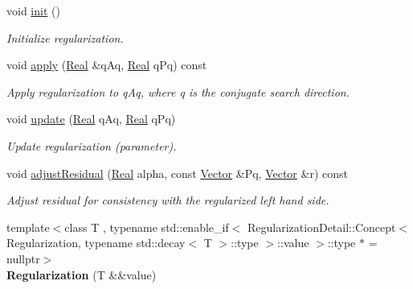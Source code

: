 \begin{DoxyCompactItemize}
\item 
\hypertarget{classSpacy_1_1CG_1_1Regularization_a0a92edab4bf50bd27bc549311c736cd5}{void \hyperlink{classSpacy_1_1CG_1_1Regularization_a0a92edab4bf50bd27bc549311c736cd5}{init} ()}\label{classSpacy_1_1CG_1_1Regularization_a0a92edab4bf50bd27bc549311c736cd5}

\begin{DoxyCompactList}\small\item\em Initialize regularization. \end{DoxyCompactList}\item 
void \hyperlink{classSpacy_1_1CG_1_1Regularization_ab55da1e68e5f25b89aa3713b95d254bd}{apply} (\hyperlink{classSpacy_1_1Real}{Real} \&q\-Aq, \hyperlink{classSpacy_1_1Real}{Real} q\-Pq) const 
\begin{DoxyCompactList}\small\item\em Apply regularization to q\-Aq, where q is the conjugate search direction. \end{DoxyCompactList}\item 
void \hyperlink{classSpacy_1_1CG_1_1Regularization_ae529ec998f6902bb88aea81461f72e65}{update} (\hyperlink{classSpacy_1_1Real}{Real} q\-Aq, \hyperlink{classSpacy_1_1Real}{Real} q\-Pq)
\begin{DoxyCompactList}\small\item\em Update regularization (parameter). \end{DoxyCompactList}\item 
void \hyperlink{classSpacy_1_1CG_1_1Regularization_a1e7aef0bb066f3e07022141de223b606}{adjust\-Residual} (\hyperlink{classSpacy_1_1Real}{Real} alpha, const \hyperlink{classSpacy_1_1Vector}{Vector} \&Pq, \hyperlink{classSpacy_1_1Vector}{Vector} \&r) const 
\begin{DoxyCompactList}\small\item\em Adjust residual for consistency with the regularized left hand side. \end{DoxyCompactList}\item 
\hypertarget{classSpacy_1_1CG_1_1Regularization_a7758d476b09bbaa7ad7aa2acf010085f}{{\footnotesize template$<$class T , typename std\-::enable\-\_\-if$<$ Regularization\-Detail\-::\-Concept$<$ Regularization, typename std\-::decay$<$ T $>$\-::type $>$\-::value $>$\-::type $\ast$  = nullptr$>$ }\\{\bfseries Regularization} (T \&\&value)}\label{classSpacy_1_1CG_1_1Regularization_a7758d476b09bbaa7ad7aa2acf010085f}


\end{DoxyCompactItemize}
